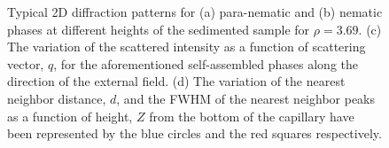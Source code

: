 \documentclass[aps,prl,preprint,superscriptaddress]{revtex4-1} %
\begin{document}
\begin{figure}[t]
\caption{Typical 2D diffraction patterns for (a) para-nematic and (b) nematic phases at different heights of the sedimented sample for $\rho=3.69$. (c) The variation of the scattered intensity as a function of scattering vector, $q$, for the aforementioned self-assembled phases along the direction of the external field. (d) The variation of the nearest neighbor distance, $d$, and the FWHM of the nearest neighbor peaks as a function of height, $Z$ from the bottom of the capillary have been represented by the blue circles and the red squares respectively.}\label{z_scan_high}
\end{figure}

\end{document}
